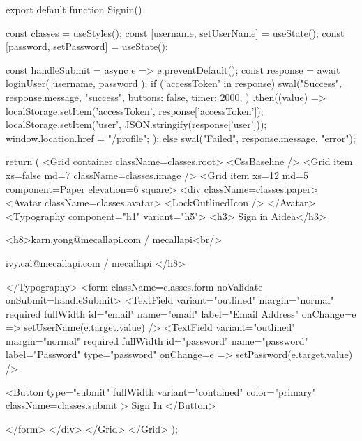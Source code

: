 export default function Signin() {
  const classes = useStyles();
  const [username, setUserName] = useState();
  const [password, setPassword] = useState();

  const handleSubmit = async e => {
    e.preventDefault();
    const response = await loginUser({
      username,
      password
    });
    if ('accessToken' in response) {
      swal("Success", response.message, "success", {
        buttons: false,
        timer: 2000,
      })
      .then((value) => {
        localStorage.setItem('accessToken', response['accessToken']);
        localStorage.setItem('user', JSON.stringify(response['user']));
        window.location.href = "/profile";
      });
    } else {
      swal("Failed", response.message, "error");
    }
  }

  return (
    <Grid container className={classes.root}>
      <CssBaseline />
      <Grid item xs={false} md={7} className={classes.image} />
      <Grid item xs={12} md={5} component={Paper} elevation={6} square>
        <div className={classes.paper}>
          <Avatar className={classes.avatar}>
            <LockOutlinedIcon />
          </Avatar>
          <Typography component="h1" variant="h5">
           <h3> Sign in  Aidea</h3> 
          
            <h8>karn.yong@mecallapi.com / mecallapi<br/>
          
          ivy.cal@mecallapi.com / mecallapi </h8>

          </Typography>
          <form className={classes.form} noValidate onSubmit={handleSubmit}>
            <TextField
              variant="outlined"
              margin="normal"
              required
              fullWidth
              id="email"
              name="email"
              label="Email Address"
              onChange={e => setUserName(e.target.value)}
            />
            <TextField
              variant="outlined"
              margin="normal"
              required
              fullWidth
              id="password"
              name="password"
              label="Password"
              type="password"
              onChange={e => setPassword(e.target.value)}
            />
           
            <Button
              type="submit"
              fullWidth
              variant="contained"
              color="primary"
              className={classes.submit}
            >
              Sign In
            </Button>
            
          </form>
        </div>
      </Grid>
    </Grid>
  );
}